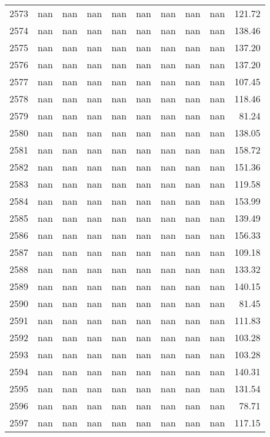 \begin{tabular}{lrrrrrrrrr}
2573 & nan & nan & nan & nan & nan & nan & nan & nan & 121.72 \\
2574 & nan & nan & nan & nan & nan & nan & nan & nan & 138.46 \\
2575 & nan & nan & nan & nan & nan & nan & nan & nan & 137.20 \\
2576 & nan & nan & nan & nan & nan & nan & nan & nan & 137.20 \\
2577 & nan & nan & nan & nan & nan & nan & nan & nan & 107.45 \\
2578 & nan & nan & nan & nan & nan & nan & nan & nan & 118.46 \\
2579 & nan & nan & nan & nan & nan & nan & nan & nan & 81.24 \\
2580 & nan & nan & nan & nan & nan & nan & nan & nan & 138.05 \\
2581 & nan & nan & nan & nan & nan & nan & nan & nan & 158.72 \\
2582 & nan & nan & nan & nan & nan & nan & nan & nan & 151.36 \\
2583 & nan & nan & nan & nan & nan & nan & nan & nan & 119.58 \\
2584 & nan & nan & nan & nan & nan & nan & nan & nan & 153.99 \\
2585 & nan & nan & nan & nan & nan & nan & nan & nan & 139.49 \\
2586 & nan & nan & nan & nan & nan & nan & nan & nan & 156.33 \\
2587 & nan & nan & nan & nan & nan & nan & nan & nan & 109.18 \\
2588 & nan & nan & nan & nan & nan & nan & nan & nan & 133.32 \\
2589 & nan & nan & nan & nan & nan & nan & nan & nan & 140.15 \\
2590 & nan & nan & nan & nan & nan & nan & nan & nan & 81.45 \\
2591 & nan & nan & nan & nan & nan & nan & nan & nan & 111.83 \\
2592 & nan & nan & nan & nan & nan & nan & nan & nan & 103.28 \\
2593 & nan & nan & nan & nan & nan & nan & nan & nan & 103.28 \\
2594 & nan & nan & nan & nan & nan & nan & nan & nan & 140.31 \\
2595 & nan & nan & nan & nan & nan & nan & nan & nan & 131.54 \\
2596 & nan & nan & nan & nan & nan & nan & nan & nan & 78.71 \\
2597 & nan & nan & nan & nan & nan & nan & nan & nan & 117.15 \\

\end{tabular}
